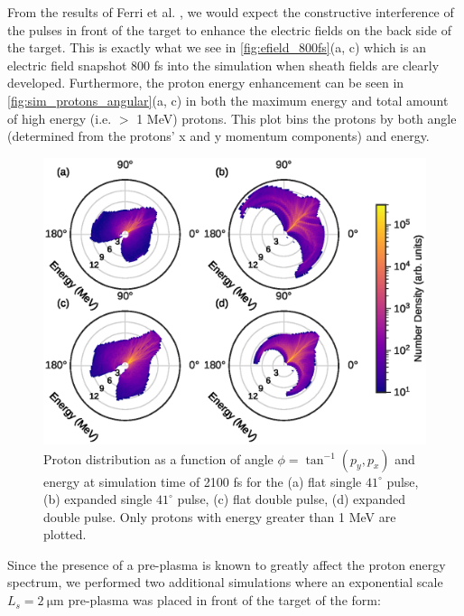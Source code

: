 From the results of Ferri et al. \cite{Ferri_2019_Nat_Comm}, we would expect the constructive interference of the pulses in front of the target to enhance the electric fields on the back side of the target. This is exactly what we see in \autoref{fig:efield_800fs}(a, c) which is an electric field snapshot 800 fs into the simulation when sheath fields are clearly developed. Furthermore, the proton energy enhancement can be seen in \autoref{fig:sim_protons_angular}(a, c) in both the maximum energy and total amount of high energy (i.e. $>$ 1 MeV) protons. This plot bins the protons by both angle (determined from the protons' x and y momentum components) and energy.

\begin{figure}
	\centering
	\includegraphics[width=0.9\linewidth]{planning/images/titan/proton_angular_density_2100fs.eps}
	\caption{Proton distribution as a function of angle $\phi = \tan^{-1}(p_y, p_x)$ and energy at simulation time of 2100 fs for the (a) flat single $41^\circ$ pulse, (b) expanded single $41^\circ$ pulse, (c) flat double pulse, (d) expanded double pulse. Only protons with energy greater than 1 MeV are plotted. }
	\label{fig:sim_protons_angular}
\end{figure}

Since the presence of a pre-plasma is known to greatly affect the proton energy spectrum, we performed two additional simulations where an exponential scale $L_s = \SI{2}{\micro \meter}$ pre-plasma was placed in front of the target of the form: 

